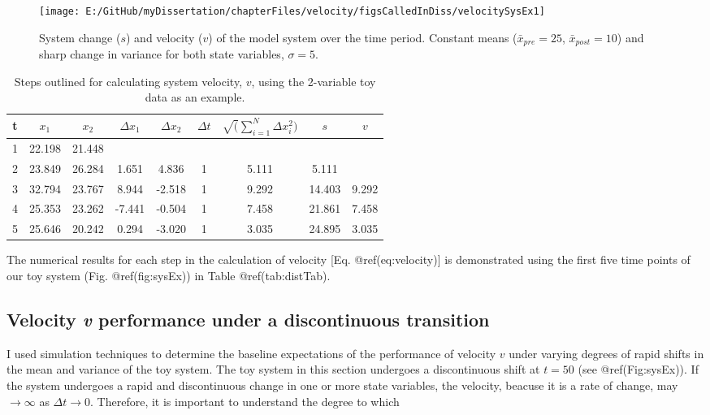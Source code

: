 \documentclass[]{article}
\begin{document}
\begin{figure}

{\centering \texttt{[image: E:/GitHub/myDissertation/chapterFiles/velocity/figsCalledInDiss/velocitySysEx1]} 

}

\caption{System change ($s$) and velocity ($v$) of the model system over the time period. Constant means ($\bar{x}_{pre}=25$, $\bar{x}_{post}=10$) and sharp change in variance for both state variables, $\sigma =5$.}\label{fig:velocSysEx1}
\end{figure}

\begin{table}[t]

\caption{\label{tab:distTab}Steps outlined for calculating system velocity, $v$, using the 2-variable toy data as an example.}
\centering
\begin{tabular}{ccccccccc}
\toprule
t & $x_1$ & $x_2$ & $\Delta x_1$ & $\Delta x_2$ & $\Delta t$ & $\sqrt(\sum_{i=1}^N \Delta x_i^2) $ & $s$ & $v$\\
\midrule
1 & 22.198 & 21.448 &  &  &  &  &  & \\
2 & 23.849 & 26.284 & 1.651 & 4.836 & 1 & 5.111 & 5.111 & \\
3 & 32.794 & 23.767 & 8.944 & -2.518 & 1 & 9.292 & 14.403 & 9.292\\
4 & 25.353 & 23.262 & -7.441 & -0.504 & 1 & 7.458 & 21.861 & 7.458\\
5 & 25.646 & 20.242 & 0.294 & -3.020 & 1 & 3.035 & 24.895 & 3.035\\
\bottomrule
\end{tabular}
\end{table}

The numerical results for each step in the calculation of velocity
{[}Eq. @ref(eq:velocity){]} is demonstrated using the first five time
points of our toy system (Fig. @ref(fig:sysEx)) in Table
@ref(tab:distTab).

\hypertarget{velocity-v-performance-under-a-discontinuous-transition}{%
\subsection{\texorpdfstring{Velocity \emph{v} performance under a
discontinuous
transition}{Velocity v performance under a discontinuous transition}}\label{velocity-v-performance-under-a-discontinuous-transition}}

I used simulation techniques to determine the baseline expectations of
the performance of velocity \(v\) under varying degrees of rapid shifts
in the mean and variance of the toy system. The toy system in this
section undergoes a discontinuous shift at \(t = 50\) (see
@ref(Fig:sysEx)). If the system undergoes a rapid and discontinuous
change in one or more state variables, the velocity, beacuse it is a
rate of change, may \(\rightarrow \infty\) as
\(\Delta t \rightarrow 0\). Therefore, it is important to understand the
degree to which
\end{document}
